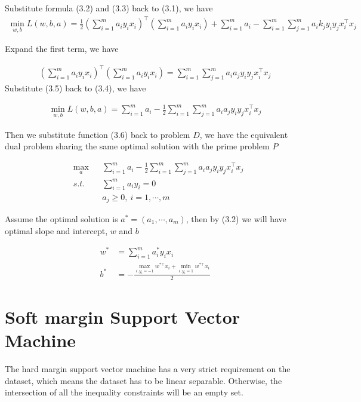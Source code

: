 \documentclass[a4paper]{report}
\begin{document}
Substitute formula (3.2) and (3.3) back to (3.1), we have
\begin{align}
    \min_{w,b} L(w,b,a) = \frac{1}{2}\left( \sum_{i=1}^m a_i y_i x_i \right)^\top \left( \sum_{i=1}^m a_i y_i x_i\right) + \sum_{i=1}^m a_i - \sum_{i=1}^m\sum_{j=1}^m a_i k_j y_i y_j x_i^\top x_j
\end{align}

Expand the first term, we have 

\begin{align}
    \left( \sum_{i=1}^m a_i y_i x_i \right)^\top \left( \sum_{i=1}^m a_i y_i x_i\right)= \sum_{i=1}^m\sum_{j=1}^m a_i a_j y_i y_j x_i^\top x_j
\end{align}
Substitute (3.5) back to (3.4), we have

\begin{align}
    \min_{w,b} L(w,b,a) = \sum_{i=1}^m a_i - \frac{1}{2} \sum_{i=1}^m\sum_{j=1}^m a_i a_j y_i y_j x_i^\top x_j
\end{align}

Then we substitute function (3.6) back to problem $D$, we have the equivalent dual problem sharing the same optimal solution with the prime problem $P$

\begin{align*}
    &\max_a & & \sum_{i=1}^m a_i - \frac{1}{2} \sum_{i=1}^m\sum_{j=1}^m a_i a_j y_i y_j x_i^\top x_j \\
    &s.t. \ & & \sum_{i=1}^m a_i y_i=0 \\
    & & & a_j\geq 0,\ i=1,\cdots,m
\end{align*}

Assume the optimal solution is $a^*=(a_1,\cdots,a_m)$, then by (3.2) we will have optimal slope and intercept, $w$ and $b$

\begin{align}
    w^*&=\sum_{i=1}^m a_i^* y_ix_i \\
    b^*&=-\frac{\max_{i,y_i=-1}w^{*\top}x_i + \min_{i,y_i=1} w^{*\top} x_i}{2}
\end{align}


\section{Soft margin Support Vector Machine}

The hard margin support vector machine has a very strict requirement on the dataset, which means the dataset has to be linear separable. Otherwise, the intersection of all the inequality constraints will be an empty set.
\end{document}
